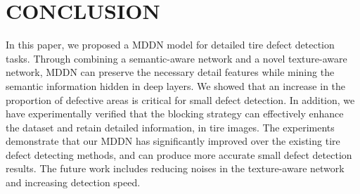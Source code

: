 \documentclass{article}
\begin{document}
%
%
%




\section{CONCLUSION}
\label{sec:typestyle}

In this paper, we proposed a MDDN model for detailed tire defect detection tasks. Through combining a semantic-aware network and a novel texture-aware network, MDDN can preserve the necessary detail features while mining the semantic information hidden in deep layers. We showed that an increase in the proportion of defective areas is critical for small defect detection. In addition, we have experimentally verified that the blocking strategy can effectively enhance the dataset and retain detailed information, in tire images. The experiments demonstrate that our MDDN has significantly improved over the existing tire defect detecting methods, and can produce more accurate small defect detection results. The future work includes reducing noises in the texture-aware network and increasing detection speed.


\vfill\pagebreak






\end{document}
